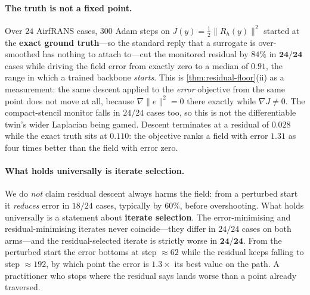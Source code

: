 \paragraph{The truth is not a fixed point.} Over $24$ AirfRANS cases, $300$ Adam steps
on $J(y)=\tfrac12\|R_h(y)\|^2$ started at the \textbf{exact ground truth}---so the
standard reply that a surrogate is over-smoothed has nothing to attach to---cut the
monitored residual by $84\%$ in $\mathbf{24/24}$ cases while driving the field error
from exactly zero to a median of $0.91$, the range in which a trained backbone
\emph{starts}. This is \autoref{thm:residual-floor}(ii) as a measurement: the same
descent applied to the \emph{error} objective from the same point does not move at all,
because $\nabla\|e\|^2=0$ there exactly while $\nabla J\ne0$. The compact-stencil
monitor falls in $24/24$ cases too, so this is not the differentiable twin's wider
Laplacian being gamed. Descent terminates at a residual of $0.028$ while the exact truth
sits at $0.110$: the objective ranks a field with error $1.31$ as four times better than
the field with error zero.

\paragraph{What holds universally is iterate selection.} We do \emph{not} claim residual
descent always harms the field: from a perturbed start it \emph{reduces} error in
$18/24$ cases, typically by $60\%$, before overshooting. What holds universally is a
statement about \textbf{iterate selection}. The error-minimising and residual-minimising
iterates never coincide---they differ in $24/24$ cases on both arms---and the
residual-selected iterate is strictly worse in $\mathbf{24/24}$. From the perturbed
start the error bottoms at step ${\approx}62$ while the residual keeps falling to step
${\approx}192$, by which point the error is $1.3\times$ its best value on the path. A
practitioner who stops where the residual says lands worse than a point already
traversed.

